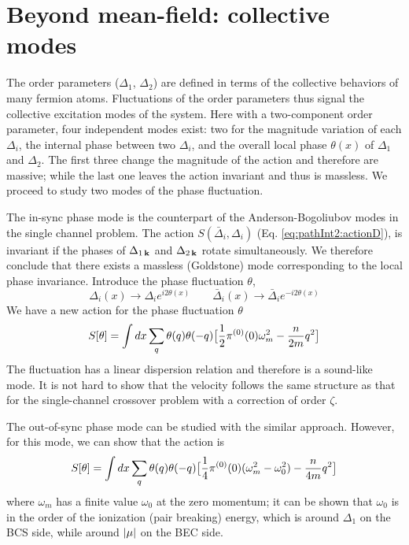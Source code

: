 \documentclass[reprint,pra]{revtex4-1}
\begin{document}
\section{Beyond mean-field:  collective modes\label{sec:bosonic}}
The order parameters ($\Delta_{1}$, $\Delta_{2}$) are defined in terms of the collective behaviors of many fermion atoms.  Fluctuations of the order parameters thus signal the collective excitation modes of the system. Here with a two-component order parameter, four independent modes exist:   two for the magnitude variation of each $\Delta_i$, the internal phase between two $\Delta_i$, and the overall local phase $\theta(x)$ of $\Delta_1$ and $\Delta_2$.  The first three change the magnitude of the action and therefore are massive; while the last one leaves the action invariant and thus is massless. 
We proceed to study two modes of the phase fluctuation.  

The in-sync phase mode is the counterpart of the Anderson-Bogoliubov modes in the single channel problem. The action $S(\bar{\Delta}_i,\Delta_i)$ (Eq. \ref{eq:pathInt2:actionD}), is invariant if the phases of $\Delta_{1\,\mathbf{k}}$ and $\Delta_{2\,\mathbf{k}}$ rotate simultaneously. We therefore conclude that there exists a massless (Goldstone) mode corresponding to the local phase invariance.  Introduce the phase fluctuation $\theta$, 
\begin{equation*}
\Delta_{i}(x)\rightarrow{}\Delta_{i}e^{i2\theta(x)}\qquad{}
\bar{\Delta}_{i}(x)\rightarrow{}\bar{\Delta}_{i}e^{-i2\theta(x)}
\end{equation*}
We have a new action for the phase fluctuation $\theta$
\begin{equation}
S[\theta]=\int{dx}\sum_{q}\theta(q)\theta(-q)\big[\frac{1}{2}\pi^{(0)}(0)\omega_m^2-\frac{n}{2m}q^2\big]
\end{equation}
The fluctuation has a linear dispersion relation and therefore is a sound-like mode.    It is not hard to show that the velocity follows the same structure as that for the single-channel crossover problem \cite{RanderiaBEC} with a correction of order  $\zeta$.

The out-of-sync phase mode can be studied with the similar approach. However, for this mode, we can show that the action is 
\begin{equation}\label{eq:pathInt2:outofphase}
S[\theta]=\int{dx}\sum_{q}\theta(q)\theta(-q)\big[\frac{1}{4}\pi^{(0)}(0)(\omega_m^2-\omega_{0}^{2})-\frac{n}{4m}q^2\big]
\end{equation}
where $\omega_{m}$ has a finite value $\omega_{0}$ at the zero momentum; it can be shown that $\omega_{0}$
 is in the order of the ionization (pair breaking) energy, which is around $\Delta_1$ on the BCS side, while around $\left\lvert{\mu}\right\rvert$ on the BEC side. 
\end{document}
